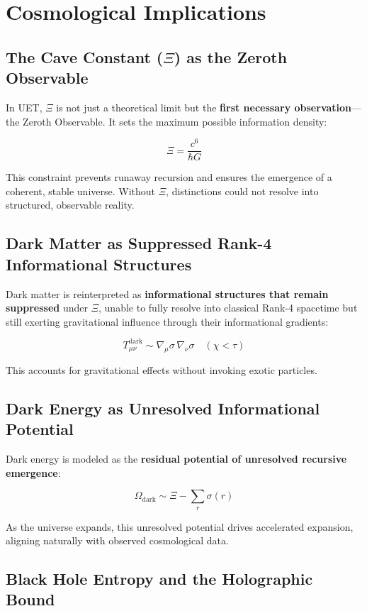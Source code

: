 \documentclass[12pt,a4paper]{article}
\begin{document}
\section{Cosmological Implications}

\subsection{The Cave Constant (\(\Xi\)) as the Zeroth Observable}

In UET, \(\Xi\) is not just a theoretical limit but the \textbf{first necessary observation}—the Zeroth Observable. It sets the maximum possible information density:

\[
\Xi = \frac{c^6}{\hbar G}
\]

This constraint prevents runaway recursion and ensures the emergence of a coherent, stable universe. Without \(\Xi\), distinctions could not resolve into structured, observable reality.

\subsection{Dark Matter as Suppressed Rank-4 Informational Structures}

Dark matter is reinterpreted as \textbf{informational structures that remain suppressed} under \(\Xi\), unable to fully resolve into classical Rank-4 spacetime but still exerting gravitational influence through their informational gradients:

\[
T_{\mu\nu}^{\text{dark}} \sim \nabla_\mu \sigma \, \nabla_\nu \sigma \quad (\chi < \tau)
\]

This accounts for gravitational effects without invoking exotic particles.

\subsection{Dark Energy as Unresolved Informational Potential}

Dark energy is modeled as the \textbf{residual potential of unresolved recursive emergence}:

\[
\Omega_{\text{dark}} \sim \Xi - \sum_{r} \sigma(r)
\]

As the universe expands, this unresolved potential drives accelerated expansion, aligning naturally with observed cosmological data.

\subsection{Black Hole Entropy and the Holographic Bound}
\end{document}
